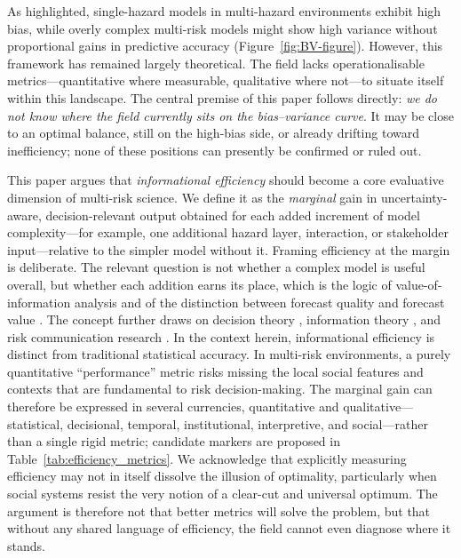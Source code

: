 \documentclass[12pt]{article}
\begin{document}
As \citet{Dunant2021} highlighted, single-hazard models in multi-hazard environments exhibit high bias, while overly complex multi-risk models might show high variance without proportional gains in predictive accuracy (Figure~\ref{fig:BV-figure}). However, this framework has remained largely theoretical. The field lacks operationalisable metrics---quantitative where measurable, qualitative where not---to situate itself within this landscape. The central premise of this paper follows directly: \textit{we do not know where the field currently sits on the bias--variance curve}. It may be close to an optimal balance, still on the high-bias side, or already drifting toward inefficiency; none of these positions can presently be confirmed or ruled out.

This paper argues that \textit{informational efficiency} should become a core evaluative dimension of multi-risk science. We define it as the \textit{marginal} gain in uncertainty-aware, decision-relevant output obtained for each added increment of model complexity---for example, one additional hazard layer, interaction, or stakeholder input---relative to the simpler model without it. Framing efficiency at the margin is deliberate. The relevant question is not whether a complex model is useful overall, but whether each addition earns its place, which is the logic of value-of-information analysis \citep{howard1966information, keisler2014value} and of the distinction between forecast quality and forecast value \citep{murphy1993good}. The concept further draws on decision theory \citep{Horvitz1995DisplayOIA}, information theory \citep{shannon1948mathematical, cover2006elements}, and risk communication research \citep{Klinke2002ANAB}. In the context herein, informational efficiency is distinct from traditional statistical accuracy. In multi-risk environments, a purely quantitative ``performance'' metric risks missing the local social features and contexts that are fundamental to risk decision-making. The marginal gain can therefore be expressed in several currencies, quantitative and qualitative---statistical, decisional, temporal, institutional, interpretive, and social---rather than a single rigid metric; candidate markers are proposed in Table~\ref{tab:efficiency_metrics}. We acknowledge that explicitly measuring efficiency may not in itself dissolve the illusion of optimality, particularly when social systems resist the very notion of a clear-cut and universal optimum. The argument is therefore not that better metrics will solve the problem, but that without any shared language of efficiency, the field cannot even diagnose where it stands.
\end{document}
